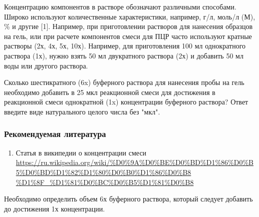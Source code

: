 
Концентрацию компонентов в растворе обозначают различными способами. Широко используют 
количественные характеристики, например, г/л, моль/л (М), \% и другие [1]. 
Например, при приготовлении растворов для нанесения образцов на гель, или при 
расчете компонентов смеси для ПЦР часто используют кратные растворы (2х, 4х, 5х, 10х). 
Например, для приготовления 100 мл однократного раствора (1х), нужно взять 50 мл двукратного раствора 
(2х) и добавить 50 мл воды или другого раствора.

Сколько шестикратного (6x) буферного раствора для нанесения пробы на гель необходимо добавить в 25 мкл реакционной смеси для достижения в реакционной смеси однократной (1x) концентрации буферного раствора? Ответ введите виде натурального целого числа без "мкл". 

\subsubsection*{Рекомендуемая литература}

\begin{enumerate}
    \item Статья в википедии о концентрации смеси \url{https://ru.wikipedia.org/wiki/%D0%9A%D0%BE%D0%BD%D1%86%D0%B5%D0%BD%D1%82%D1%80%D0%B0%D1%86%D0%B8} \linebreak \url{%D1%8F_%D1%81%D0%BC%D0%B5%D1%81%D0%B8}
\end{enumerate}

\explanationSection

Необходимо определить объем 6х буферного раствора, который следует добавить до достижения 1х концентрации.

